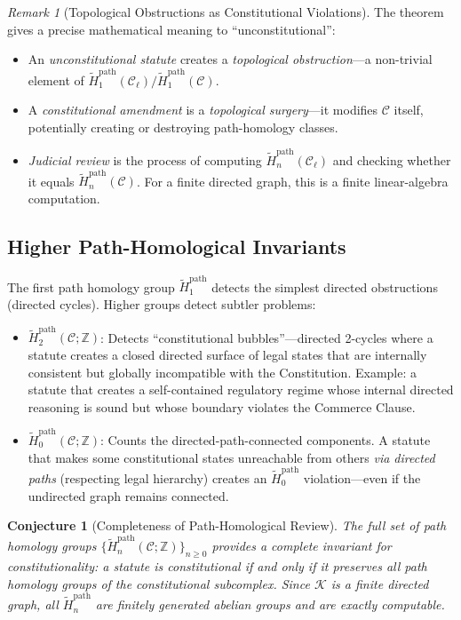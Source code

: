\documentclass[12pt]{article}
\newtheorem{conjecture}[theorem]{Conjecture}
\theoremstyle{definition}
\theoremstyle{remark}
\newtheorem{remark}[theorem]{Remark}
\newcommand{\C}{\mathcal{C}}               %
\newcommand{\Z}{\mathbb{Z}}
\begin{document}
\begin{remark}[Topological Obstructions as Constitutional Violations]
The theorem gives a precise mathematical meaning to ``unconstitutional'':
\begin{itemize}
    \item An \emph{unconstitutional statute} creates a \emph{topological obstruction}---a non-trivial element of $\widetilde{H}_1^{\text{path}}(\C_\ell) / \widetilde{H}_1^{\text{path}}(\C)$.
    \item A \emph{constitutional amendment} is a \emph{topological surgery}---it modifies $\C$ itself, potentially creating or destroying path-homology classes.
    \item \emph{Judicial review} is the process of computing $\widetilde{H}_n^{\text{path}}(\C_\ell)$ and checking whether it equals $\widetilde{H}_n^{\text{path}}(\C)$.  For a finite directed graph, this is a finite linear-algebra computation.
\end{itemize}
\end{remark}

\subsection{Higher Path-Homological Invariants}

The first path homology group $\widetilde{H}_1^{\text{path}}$ detects the simplest directed obstructions (directed cycles).  Higher groups detect subtler problems:

\begin{itemize}
    \item $\widetilde{H}_2^{\text{path}}(\C; \Z)$: Detects ``constitutional bubbles''---directed 2-cycles where a statute creates a closed directed surface of legal states that are internally consistent but globally incompatible with the Constitution.  Example: a statute that creates a self-contained regulatory regime whose internal directed reasoning is sound but whose boundary violates the Commerce Clause.
    \item $\widetilde{H}_0^{\text{path}}(\C; \Z)$: Counts the directed-path-connected components.  A statute that makes some constitutional states unreachable from others \emph{via directed paths} (respecting legal hierarchy) creates an $\widetilde{H}_0^{\text{path}}$ violation---even if the undirected graph remains connected.
\end{itemize}

\begin{conjecture}[Completeness of Path-Homological Review]
\label{conj:complete}
The full set of path homology groups $\{\widetilde{H}_n^{\text{path}}(\C; \Z)\}_{n \geq 0}$ provides a complete invariant for constitutionality: a statute is constitutional if and only if it preserves all path homology groups of the constitutional subcomplex.  Since $\mathcal{K}$ is a finite directed graph, all $\widetilde{H}_n^{\text{path}}$ are finitely generated abelian groups and are exactly computable.
\end{conjecture}
\end{document}
